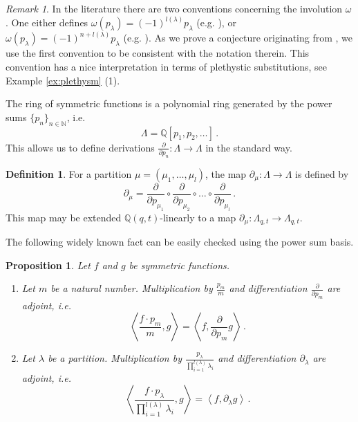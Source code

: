 \documentclass[12pt,a4paper]{amsart}
\theoremstyle{plain}
\newtheorem{pro}[tw]{Proposition}
\theoremstyle{definition}
\newtheorem{df}[tw]{Definition}
\theoremstyle{remark}
\newtheorem{rem}[tw]{Remark}
\newcommand{\NN}{\mathbb{N}}
\newcommand{\QQ}{\mathbb{Q}}
\begin{document}
\begin{rem}
	In the literature there are two conventions concerning the involution $\omega$. One either defines $\omega (p_\lambda)=(-1)^{l(\lambda)}p_\lambda$ (e.g. \cite{Boissiere}), or $\omega (p_\lambda)=(-1)^{n+l(\lambda)}p_\lambda$ (e.g. \cite{Macdonald,Haiman_surv}). As we prove a conjecture originating from \cite{Boissiere}, we use the first convention to be consistent with the notation therein. This convention has a nice interpretation in terms of plethystic substitutions, see Example \ref{ex:plethysm} (1).
\end{rem}
The ring of symmetric functions is a polynomial ring generated by the power sums $\{p_n\}_{n\in \NN}$, i.e.
\begin{equation} \label{w:3}
	\Lambda=\QQ[p_1,p_2,\dots]\,.
\end{equation}
This allows us to define derivations $\frac{\partial}{\partial p_n}:\Lambda\to\Lambda$ in the standard way.
\begin{df}
	For a partition $\mu=(\mu_1,\dots,\mu_l)$, the map $\partial_{\mu}:\Lambda\to\Lambda$ is defined by
	$$\partial_{\mu}=\frac{\partial}{\partial p_{\mu_1}}\circ\frac{\partial}{\partial p_{\mu_2}}\circ\dots\circ \frac{\partial}{\partial p_{\mu_l}}\,.$$
	This map may be extended $\QQ(q,t)$-linearly to a map $\partial_{\mu}:\Lambda_{q,t}\to\Lambda_{q,t}$.
\end{df}
The following widely known fact can be easily checked using the power sum basis.
\begin{pro} \label{pro:adjoint}
	Let $f$ and $g$ be symmetric functions.
	\begin{enumerate}
		\item Let $m$ be a natural number.  Multiplication by $\frac{p_m}{m}$ and differentiation $\frac{\partial}{\partial p_m}$ are adjoint, i.e.
		$$\left\langle \frac{f\cdot p_m}{m},g\right\rangle= \left\langle f,\frac{\partial}{\partial p_m}g\right\rangle\,. $$
		\item Let $\lambda$ be a partition. Multiplication by $\frac{p_\lambda}{\prod_{i=1}^{l(\lambda)}\lambda_i}$ and differentiation $\partial_\lambda$ are adjoint, i.e.
		$$\left\langle \frac{f\cdot p_\lambda}{\prod_{i=1}^{l(\lambda)}\lambda_i},g\right\rangle= \left\langle f,\partial_\lambda g\right\rangle\,. $$
	\end{enumerate}
\end{pro}
\end{document}
